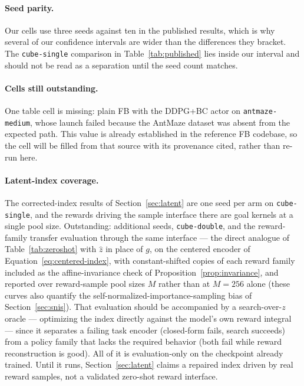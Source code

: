 \documentclass{article}
\begin{document}
\paragraph{Seed parity.}
Our cells use three seeds against ten in the published results, which is why several of our confidence intervals are wider than the differences they bracket.
The \texttt{cube-single} comparison in Table~\ref{tab:published} lies inside our interval and should not be read as a separation until the seed count matches.

\paragraph{Cells still outstanding.}
One table cell is missing: plain FB with the DDPG+BC actor on \texttt{antmaze-medium}, whose launch failed because the AntMaze dataset was absent from the expected path.
This value is already established in the reference FB codebase, so the cell will be filled from that source with its provenance cited, rather than re-run here.

\paragraph{Latent-index coverage.}
The corrected-index results of Section~\ref{sec:latent} are one seed per arm on \texttt{cube-single}, and the rewards driving the sample interface there are goal kernels at a single pool size.
Outstanding: additional seeds, \texttt{cube-double}, and the reward-family transfer evaluation through the same interface --- the direct analogue of Table~\ref{tab:zeroshot} with $\hat z$ in place of $g$, on the centered encoder of Equation~\ref{eq:centered-index}, with constant-shifted copies of each reward family included as the affine-invariance check of Proposition~\ref{prop:invariance}, and reported over reward-sample pool sizes $M$ rather than at $M=256$ alone (these curves also quantify the self-normalized-importance-sampling bias of Section~\ref{sec:snis}).
That evaluation should be accompanied by a search-over-$z$ oracle --- optimizing the index directly against the model's own reward integral --- since it separates a failing task encoder (closed-form fails, search succeeds) from a policy family that lacks the required behavior (both fail while reward reconstruction is good).
All of it is evaluation-only on the checkpoint already trained.
Until it runs, Section~\ref{sec:latent} claims a repaired index driven by real reward samples, not a validated zero-shot reward interface.
\end{document}
